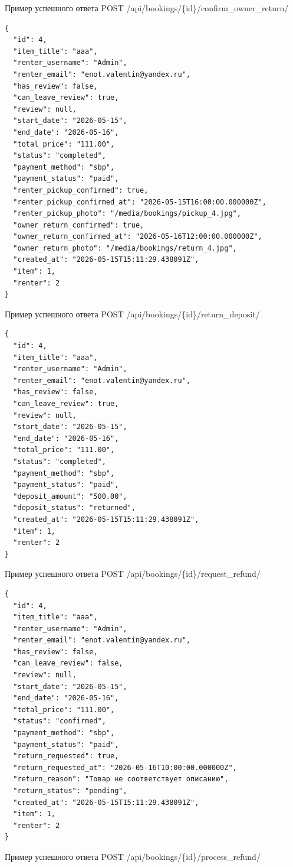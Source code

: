 Пример успешного ответа POST /api/bookings/\{id\}/confirm\_owner\_return/

\begin{verbatim}
{
  "id": 4,
  "item_title": "ааа",
  "renter_username": "Admin",
  "renter_email": "enot.valentin@yandex.ru",
  "has_review": false,
  "can_leave_review": true,
  "review": null,
  "start_date": "2026-05-15",
  "end_date": "2026-05-16",
  "total_price": "111.00",
  "status": "completed",
  "payment_method": "sbp",
  "payment_status": "paid",
  "renter_pickup_confirmed": true,
  "renter_pickup_confirmed_at": "2026-05-15T16:00:00.000000Z",
  "renter_pickup_photo": "/media/bookings/pickup_4.jpg",
  "owner_return_confirmed": true,
  "owner_return_confirmed_at": "2026-05-16T12:00:00.000000Z",
  "owner_return_photo": "/media/bookings/return_4.jpg",
  "created_at": "2026-05-15T15:11:29.438091Z",
  "item": 1,
  "renter": 2
}
\end{verbatim}

Пример успешного ответа POST /api/bookings/\{id\}/return\_deposit/

\begin{verbatim}
{
  "id": 4,
  "item_title": "ааа",
  "renter_username": "Admin",
  "renter_email": "enot.valentin@yandex.ru",
  "has_review": false,
  "can_leave_review": true,
  "review": null,
  "start_date": "2026-05-15",
  "end_date": "2026-05-16",
  "total_price": "111.00",
  "status": "completed",
  "payment_method": "sbp",
  "payment_status": "paid",
  "deposit_amount": "500.00",
  "deposit_status": "returned",
  "created_at": "2026-05-15T15:11:29.438091Z",
  "item": 1,
  "renter": 2
}
\end{verbatim}

Пример успешного ответа POST /api/bookings/\{id\}/request\_refund/

\begin{verbatim}
{
  "id": 4,
  "item_title": "ааа",
  "renter_username": "Admin",
  "renter_email": "enot.valentin@yandex.ru",
  "has_review": false,
  "can_leave_review": false,
  "review": null,
  "start_date": "2026-05-15",
  "end_date": "2026-05-16",
  "total_price": "111.00",
  "status": "confirmed",
  "payment_method": "sbp",
  "payment_status": "paid",
  "return_requested": true,
  "return_requested_at": "2026-05-16T10:00:00.000000Z",
  "return_reason": "Товар не соответствует описанию",
  "return_status": "pending",
  "created_at": "2026-05-15T15:11:29.438091Z",
  "item": 1,
  "renter": 2
}
\end{verbatim}

Пример успешного ответа POST /api/bookings/\{id\}/process\_refund/


